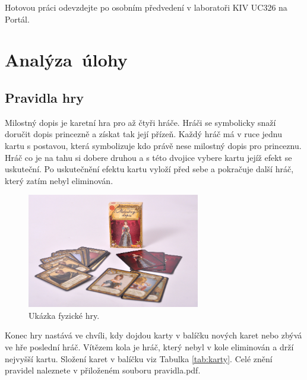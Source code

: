 \documentclass[12pt, a4paper]{article}
\begin{document}
Hotovou práci odevzdejte po osobním předvedení v laboratoři KIV UC326 na Portál.

\newpage
\section{Analýza~úlohy} %

\subsection{Pravidla hry}

Milostný dopis je karetní hra pro až čtyři hráče. Hráči se symbolicky snaží doručit dopis princezně a získat tak její přízeň. Každý hráč má v ruce jednu kartu s postavou, která symbolizuje kdo právě nese milostný dopis pro princeznu. Hráč co je na tahu si dobere druhou a s této dvojice vybere kartu jejíž efekt se uskuteční. Po uskutečnění efektu kartu vyloží před sebe a pokračuje další hráč, který zatím nebyl eliminován. 

\begin{figure}[ht]
\centering
\includegraphics[bb= 0 0 800 531 , height=5cm]{hra_fyz.jpg}
\caption{Ukázka fyzické hry.}
\label{fig:game}
\end{figure}

Konec hry nastává ve chvíli, kdy dojdou karty v balíčku nových karet nebo zbývá ve hře poslední hráč. Vítězem kola je hráč, který nebyl v kole eliminován a drží nejvyšší kartu. Složení karet v balíčku viz Tabulka \ref{tab:karty}. Celé znění pravidel naleznete v přiloženém souboru pravidla.pdf.
\end{document}
